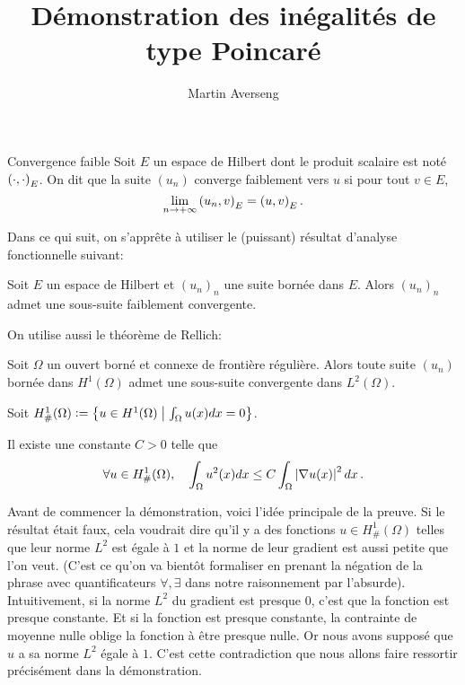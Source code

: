 \documentclass[]{article}
\title{Démonstration des inégalités de type Poincaré}
\author{Martin Averseng}
\begin{document}
\maketitle



\begin{Def}{Convergence faible}
	Soit $E$ un espace de Hilbert dont le produit scalaire est noté $\left( \cdot,\cdot\right)_E$. On dit que la suite $(u_n)$ converge faiblement vers $u$ si pour tout $v \in E$, 
	\[\lim_{n \to + \infty} \left( u_n,v\right)_E = \left( u,v\right)_E.\]
\end{Def}

Dans ce qui suit, on s'apprête à utiliser le (puissant) résultat d'analyse fonctionnelle suivant: 

\begin{The}
	Soit $E$ un espace de Hilbert et $(u_n)_n$ une suite bornée dans $E$. Alors $(u_n)_n$ admet une sous-suite faiblement convergente. 
	\label{Faible}
\end{The}

On utilise aussi le théorème de Rellich:
\begin{The}
	Soit $\Omega$ un ouvert borné et connexe de frontière régulière. Alors toute suite $(u_n)$ bornée dans $H^1(\Omega)$ admet une sous-suite convergente dans $L^2(\Omega)$. 
\end{The}


Soit $H^1_\#(\Omega) \mathrel{\mathop:}= \left\{ u \in H^1(\Omega)\mathrel{}\middle|\mathrel{} \int_{\Omega} u(x) dx = 0\right\}$.
\begin{The}
	Il existe une constante $C > 0$ telle que 
	\[\forall u \in H^1_\#(\Omega),\quad \int_{\Omega} u^2(x) dx \leq C \int_{\Omega} \left\lvert \nabla u(x) \right\rvert^2dx\,.\]
\end{The}


Avant de commencer la démonstration, voici l'idée principale de la preuve. Si le résultat était faux, cela voudrait dire qu'il y a des fonctions $u \in H^1_\#(\Omega)$ telles que leur norme $L^2$ est égale à $1$ et la norme de leur gradient est aussi petite que l'on veut. (C'est ce qu'on va bientôt formaliser en prenant la négation de la phrase avec quantificateurs $\forall, \exists$ dans notre raisonnement par l'absurde). Intuitivement, si la norme $L^2$ du gradient est presque $0$, c'est que la fonction est presque constante. Et si la fonction est presque constante, la contrainte de moyenne nulle oblige la fonction à être presque nulle. Or nous avons supposé que $u$ a sa norme $L^2$ égale à $1$. C'est cette contradiction que nous allons faire ressortir précisément dans la démonstration. 
\end{document}
